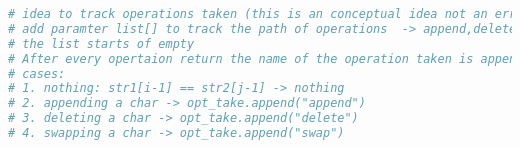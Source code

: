 \begin{lstlisting}[language=Python]
# idea to track operations taken (this is an conceptual idea not an error proof implementation):
# add paramter list[] to track the path of operations  -> append,delete,swap -> edit_distance(str1,str2,opt_taken)
# the list starts of empty  
# After every opertaion return the name of the operation taken is appended to the list -> done by checking which index in matrix in min() was chosen.
# cases:
# 1. nothing: str1[i-1] == str2[j-1] -> nothing
# 2. appending a char -> opt_take.append("append")
# 3. deleting a char -> opt_take.append("delete")
# 4. swapping a char -> opt_take.append("swap")

\end{lstlisting}